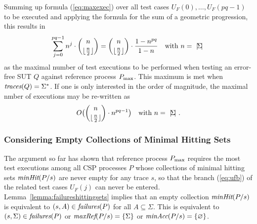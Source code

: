 Summing up  formula 
(\ref{eq:maxexec}) over all test cases $U_F(0),\dots,U_F(pq-1)$ to be executed and applying the formula for the sum of a geometric progression,  this results in
%
\begin{equation}\label{eq:pmaxcomplexity}
\sum_{j=0}^{pq-1} n^{j}\cdot \binom{n}{\lfloor\frac{n}{2}\rfloor}  = 
\binom{n}{\lfloor\frac{n}{2}\rfloor}\cdot\frac{1-n^{pq}}{1-n}\quad\text{with $n={~|\! \Sigma\!|~}$}
\end{equation}
%
as the maximal number of test executions to be performed when testing an error-free
SUT $Q$ against reference process $P_\text{max}$. This maximum is met when $\text{\it traces}(Q) = \Sigma^*$.
If one is only interested in the order of magnitude, the maximal nmber of executions 
may be re-written as 
%
\begin{equation} 
\label{eq:maxO}
O\big(\binom{n}{\lfloor\frac{n}{2}\rfloor}\cdot n^{pq-1}\big)\quad\text{with $n={~|\! \Sigma\!|~}$}.
\end{equation} 


\subsubsection*{Considering Empty Collections of Minimal Hitting Sets} 

The argument so far has shown that reference process $P_\text{max}$ requires the most test 
executions among all CSP processes $P$ whose collections of minimal hitting sets  
$\text{\it minHit}(P/s)$ are never empty for any trace $s$, so that the branch 
(\ref{eq:ufb}) of the related test cases $U_F(j)$ can never be entered.  
Lemma~\ref{lemma:failureshittingsets} implies that an empty collection 
$\text{\it minHit}(P/s)$
is equivalent to $(s,A)\in\text{\it failures}(P)$ for all $A\subseteq\Sigma$. This is equivalent to
$(s,\Sigma)\in\text{\it failures}(P)$ or
$\text{\it maxRef}(P/s) = \{ \Sigma \}$ or $\text{\it minAcc}(P/s) = \{ \varnothing\}$.

